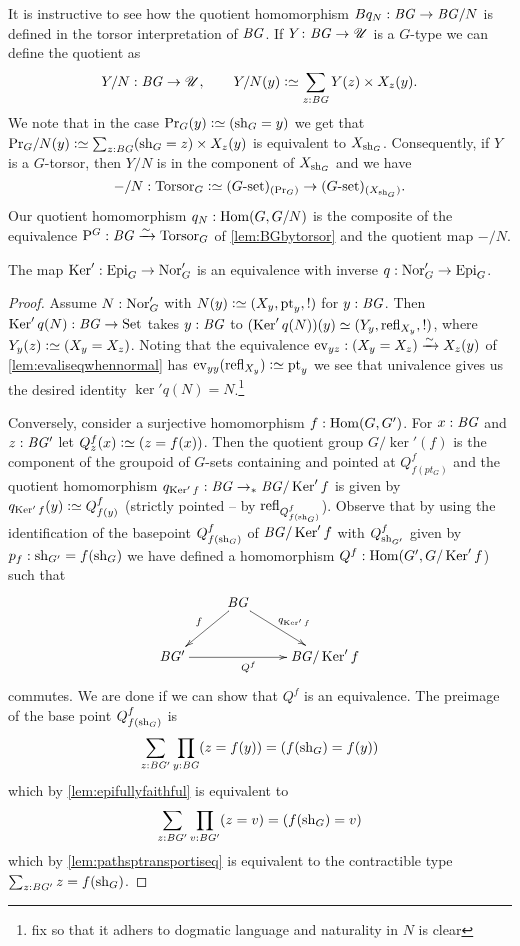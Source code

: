 \begin{remark}
It is instructive to see how the quotient homomorphism $Bq_N:\mathit{B}\mathit{G}\to \mathit{B}\mathit{G}/N$ is defined in the torsor interpretation of $\mathit{B}\mathit{G}$.  If $Y\colon \mathit{B}\mathit{G}\to{\mathscr{U}}$ is a $G$-type we can define the quotient as
$$
Y/N:\BG\to\UU,\qquad Y/N(y)\defequi\sum_{z:\BG}Y(z)\times X_z(y).
$$
We note that in the case $\princ G(y)\defequi (\sh_G=y)$ we get
that 
$
\princ G /N(y)\defequi\sum_{z:\BG}(\sh_G=z)\times X_z(y)
$
is equivalent to $X_{\mathrm{sh}_G}$.  Consequently, if $Y$ is a $G$-torsor, then $Y/N$ is in the component of $X_{\mathrm{sh}_G}$ and we have
$$-/N:\typetorsor_G\defequi (G\text{-set})_{(\princ G)}\to (G\text{-set})_{(X_{\sh_G})}.
$$ Our quotient homomorphism $q_N:\Hom(G,G/N)$ is the composite of the equivalence $\mathrm{P}_{\!}^G:\mathit{B}\mathit{G}\xrightarrow{\sim}\mathrm{Torsor}_G$ of \cref{lem:BGbytorsor} and the quotient map $-/N$.
\end{remark}
\begin{lemma}
  \label{lem:qeq}
  The map $\ker':\typeepi_G\to\typenormal_G'$ is an equivalence with inverse $q:\mathrm{Nor}_G'\to\mathrm{Epi}_G$.
\end{lemma}
\begin{proof}
  Assume $N:\mathrm{Nor}_G'$ with $N(y)\defequi(X_y,\pt_y,!)$ for $y:\mathit{B}\mathit{G}$.  Then $\ker' q(N):\BG\to\Set$ takes $y:\mathit{B}\mathit{G}$ to $(\ker' q(N))(y)\oldequiv(Y_y,\refl{X_y},!)$, where $Y_y(z)\defequi (X_y=X_z)$.  Noting that the equivalence $\mathrm{ev}_{yz}:(X_y=X_z)\xrightarrow{\sim} X_z(y)$ of \cref{lem:evaliseqwhennormal} has $\mathrm{ev}_{yy}(\refl{X_y})\defequi \pt_y$ we see that univalence gives us the desired identity $\ker' q(N)=N$.\footnote{fix so that it adhers to dogmatic language and naturality in $N$ is clear}

Conversely, consider a surjective homomorphism $f:\Hom(G,G')$.  
For $x:\mathit{B}\mathit{G}$ and $z:\mathit{B}\mathit{G}'$ let $Q^f_z(x)\defequi (z=f(x))$.  
Then the quotient group $G/\ker'(f)$ is the component  of the groupoid of $G$-sets containing and pointed at $Q^f_{f(pt_G)}$ and the quotient homomorphism $q_{\ker' f}:\BG\to_* \BG/\ker' f$ is given by  $q_{\ker' f}(y)\defequi Q^f_{f(y)}$ (strictly pointed -- \ie by $\mathrm{refl}_{Q^f_{f(\mathrm{sh}_G)}}$). 
Observe that by using the identification of the basepoint $Q^f_{f(\mathrm{sh}_G)}$ of $\BG/\ker'f$ with $Q^f_{\mathrm{sh}_{G'}}$ given by $p_f:\mathrm{sh}_{G'}=f(\mathrm{sh}_G)$ we have defined a homomorphism $Q^f:\Hom(G',G/\ker'f$) such that 
 $$\xymatrix{&\BG\ar[dl]_f\ar[dr]^{q_{\ker'f}}&\\
 \BG'\ar[rr]_{Q^f}&&\BG/\ker'f
}$$
commutes.
We are done if we can show that $Q^f$ is an equivalence.
The preimage of the base point $Q^f_{f(\mathrm{sh}_G)}$ is
$$\sum_{z:\mathit{B}\mathit{G}'}\prod_{y:\mathit{B}\mathit{G}}(z=f(y))=(f(\mathrm{sh}_G)=f(y))$$ 
which by 
\cref{lem:epifullyfaithful} is equivalent to
$$\sum_{z:\mathit{B}\mathit{G}'}\prod_{v:\mathit{B}\mathit{G}'}(z=v)=(f(\mathrm{sh}_G)=v)$$
which by \cref{lem:pathsptransportiseq} is equivalent to the contractible type $\sum_{z:\mathit{B}\mathit{G}'}z=f(\mathrm{sh}_G)$.
\end{proof}

